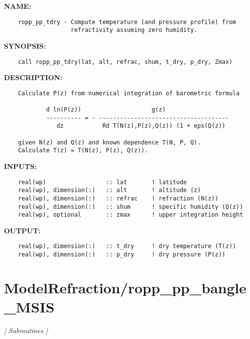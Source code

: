 \label{ch:robo33}
\label{ch:Meteo_ropp_pp_tdry}
\textbf{NAME:}\hspace{0.08in}\begin{Verbatim}
    ropp_pp_tdry - Compute temperature (and pressure profile) from 
                   refractivity assuming zero humidity.
\end{Verbatim}
\textbf{SYNOPSIS:}\hspace{0.08in}\begin{Verbatim}
    call ropp_pp_tdry(lat, alt, refrac, shum, t_dry, p_dry, Zmax)
\end{Verbatim}
\textbf{DESCRIPTION:}\hspace{0.08in}\begin{Verbatim}
    Calculate P(z) from numerical integration of barometric formula

            d ln(P(z))                    g(z)
            ---------- = - -------------------------------------
               dz           Rd T(N(z),P(z),Q(z)) (1 + eps(Q(z))

    given N(z) and Q(z) and known dependence T(N, P, Q).
    Calculate T(z) = T(N(z), P(z), Q(z)). 
\end{Verbatim}
\textbf{INPUTS:}\hspace{0.08in}\begin{Verbatim}
    real(wp)                 :: lat       ! latitude
    real(wp), dimension(:)   :: alt       ! altitude (z)
    real(wp), dimension(:)   :: refrac    ! refraction (N(z))
    real(wp), dimension(:)   :: shum      ! specific humidity (Q(z))
    real(wp), optional       :: zmax      ! upper integration height 
\end{Verbatim}
\textbf{OUTPUT:}\hspace{0.08in}\begin{Verbatim}
    real(wp), dimension(:)   :: t_dry     ! dry temperature (T(z))
    real(wp), dimension(:)   :: p_dry     ! dry pressure (P(z))
\end{Verbatim}
\section{ModelRefraction/ropp\_pp\_bangle\_MSIS}
\textsl{[ Subroutines ]}

